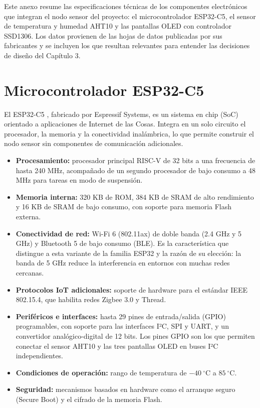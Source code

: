 
\renewcommand{\thesection}{A3.\arabic{section}}
\setcounter{section}{0}

Este anexo resume las especificaciones técnicas de los componentes electrónicos que integran el nodo sensor del proyecto: el microcontrolador ESP32-C5, el sensor de temperatura y humedad AHT10 y las pantallas OLED con controlador SSD1306. Los datos provienen de las hojas de datos publicadas por sus fabricantes y se incluyen los que resultan relevantes para entender las decisiones de diseño del Capítulo 3.

\section{Microcontrolador ESP32-C5}

El ESP32-C5 \cite{esp32c5-docs}, fabricado por Espressif Systems, es un sistema en chip (SoC) orientado a aplicaciones de Internet de las Cosas. Integra en un solo circuito el procesador, la memoria y la conectividad inalámbrica, lo que permite construir el nodo sensor sin componentes de comunicación adicionales.

\begin{itemize}
    \item \textbf{Procesamiento:} procesador principal RISC-V de 32 bits a una frecuencia de hasta 240 MHz, acompañado de un segundo procesador de bajo consumo a 48 MHz para tareas en modo de suspensión.

    \item \textbf{Memoria interna:} 320 KB de ROM, 384 KB de SRAM de alto rendimiento y 16 KB de SRAM de bajo consumo, con soporte para memoria Flash externa.

    \item \textbf{Conectividad de red:} Wi-Fi 6 (802.11ax) de doble banda (2.4 GHz y 5 GHz) y Bluetooth 5 de bajo consumo (BLE). Es la característica que distingue a esta variante de la familia ESP32 y la razón de su elección: la banda de 5 GHz reduce la interferencia en entornos con muchas redes cercanas.

    \item \textbf{Protocolos IoT adicionales:} soporte de hardware para el estándar IEEE 802.15.4, que habilita redes Zigbee 3.0 y Thread.

    \item \textbf{Periféricos e interfaces:} hasta 29 pines de entrada/salida (GPIO) programables, con soporte para las interfaces I²C, SPI y UART, y un convertidor analógico-digital de 12 bits. Los pines GPIO son los que permiten conectar el sensor AHT10 y las tres pantallas OLED en buses I²C independientes.

    \item \textbf{Condiciones de operación:} rango de temperatura de $-40~^{\circ}\text{C}$ a $85~^{\circ}\text{C}$.

    \item \textbf{Seguridad:} mecanismos basados en hardware como el arranque seguro (Secure Boot) y el cifrado de la memoria Flash.
\end{itemize}

